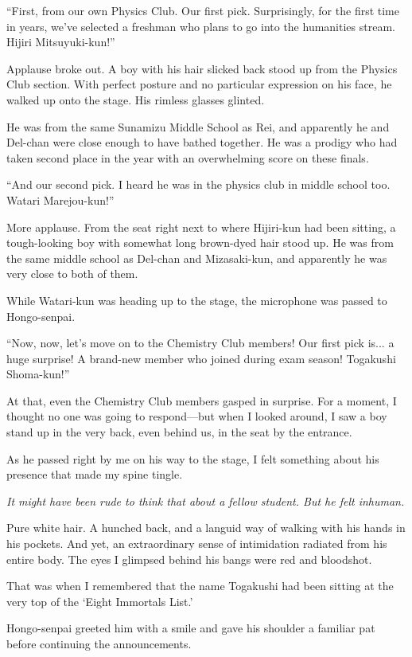 \documentclass[
    a4paper,
    12pt,
    twoside,
    openany,
    UTF8,
    fontset=windows
]{ctexbook}
\begin{document}
``First, from our own Physics Club. Our first pick. Surprisingly, for the first time in years, we've selected a freshman who plans to go into the humanities stream. Hijiri Mitsuyuki-kun!''

Applause broke out. A boy with his hair slicked back stood up from the Physics Club section. With perfect posture and no particular expression on his face, he walked up onto the stage. His rimless glasses glinted.

He was from the same Sunamizu Middle School as Rei, and apparently he and Del-chan were close enough to have bathed together. He was a prodigy who had taken second place in the year with an overwhelming score on these finals.

``And our second pick. I heard he was in the physics club in middle school too. Watari Marejou-kun!''

More applause. From the seat right next to where Hijiri-kun had been sitting, a tough-looking boy with somewhat long brown-dyed hair stood up. He was from the same middle school as Del-chan and Mizasaki-kun, and apparently he was very close to both of them.

While Watari-kun was heading up to the stage, the microphone was passed to Hongo-senpai.

``Now, now, let's move on to the Chemistry Club members! Our first pick is... a huge surprise! A brand-new member who joined during exam season! Togakushi Shoma-kun!''

At that, even the Chemistry Club members gasped in surprise. For a moment, I thought no one was going to respond---but when I looked around, I saw a boy stand up in the very back, even behind us, in the seat by the entrance.

As he passed right by me on his way to the stage, I felt something about his presence that made my spine tingle.

\textit{It might have been rude to think that about a fellow student. But he felt inhuman.}

Pure white hair. A hunched back, and a languid way of walking with his hands in his pockets. And yet, an extraordinary sense of intimidation radiated from his entire body. The eyes I glimpsed behind his bangs were red and bloodshot.

That was when I remembered that the name Togakushi had been sitting at the very top of the `Eight Immortals List.'

Hongo-senpai greeted him with a smile and gave his shoulder a familiar pat before continuing the announcements.
\end{document}
